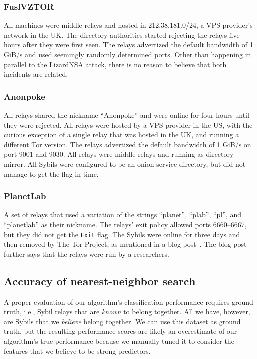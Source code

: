 \subsubsection{FuslVZTOR}
All machines were middle relays and hosted in 212.38.181.0/24, a VPS provider's
network in the UK.  The directory authorities started rejecting the relays five
hours after they were first seen.  The relays advertized the default bandwidth
of 1 GiB/s and used seemingly randomly determined ports.  Other than happening
in parallel to the LizardNSA attack, there is no reason to believe that both
incidents are related.

\subsubsection{Anonpoke}
All relays shared the nickname ``Anonpoke'' and were online for four hours until
they were rejected.  All relays were hosted by a VPS provider in the US, with
the curious exception of a single relay that was hosted in the UK, and running a
different Tor version.  The relays advertized the default bandwidth of 1 GiB/s
on port 9001 and 9030.  All relays were middle relays and running as directory
mirror.  All Sybils were configured to be an onion service directory, but did
not manage to get the flag in time.

\subsubsection{PlanetLab}
A set of relays that used a variation of the strings ``planet'', ``plab'',
``pl'', and ``planetlab'' as their nickname.  The relays' exit policy allowed
ports 6660--6667, but they did not get the \texttt{Exit} flag.  The Sybils were
online for three days and then removed by The Tor Project, as mentioned in a
blog post~\cite{progressreport}.  The blog post further says that the relays
were run by a researchers.

% 

\subsection{Accuracy of nearest-neighbor search}
\label{sec:accuracy}
A proper evaluation of our algorithm's classification performance requires
ground truth, i.e., Sybil relays that are \emph{known} to belong together.  All
we have, however, are Sybils that we \emph{believe} belong together.  We can use
this dataset as ground truth, but the resulting performance scores are likely an
overestimate of our algorithm's true performance because we manually tuned it to
consider the features that we believe to be strong predictors.

